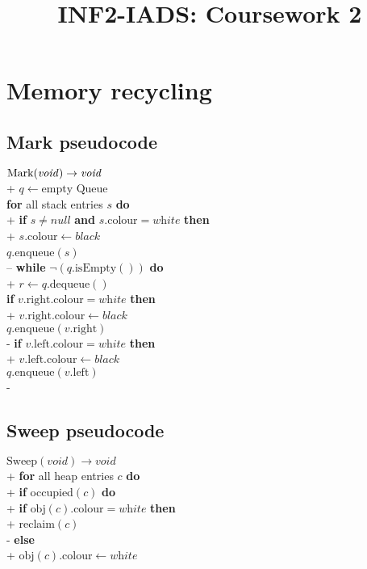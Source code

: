 \documentclass{article}
\title{INF2-IADS: Coursework 2}
\begin{document}
\maketitle

\tableofcontents

\section{Memory recycling}

\subsection{Mark pseudocode}

\begin{pseudo}
$\text{Mark}(\text{\emph{void}}) \to \text{\emph{void}}$\\+
    $q\leftarrow \text{empty Queue}$\\
    \textbf{for} all stack entries $s$ \textbf{do}\\+
        \textbf{if} $s\not=\textit{null}$ \textbf{and} $s.\text{colour} = \textit{white}$ \textbf{then}\\+
            $s.\text{colour} \leftarrow \textit{black}$\\
            $q$.enqueue$(s)$\\--
    \textbf{while} $\neg(q.\text{isEmpty}())$ \textbf{do}\\+
        $r\leftarrow q.\text{dequeue}()$\\
        \textbf{if} $v.\text{right}.\text{colour} = \textit{white}$ \textbf{then}\\+
            $v.\text{right}.\text{colour}\leftarrow\textit{black}$\\
            $q.\text{enqueue}(v.\text{right})$\\-
        \textbf{if} $v.\text{left}.\text{colour} = \textit{white}$ \textbf{then}\\+
            $v.\text{left}.\text{colour}\leftarrow\textit{black}$\\
            $q.\text{enqueue}(v.\text{left})$\\-
\end{pseudo}

\subsection{Sweep pseudocode}

\begin{pseudo}
$\text{Sweep}(\textit{void})\to\textit{void}$\\+
    \textbf{for} all heap entries $c$ \textbf{do}\\+
        \textbf{if} occupied$(c)$ \textbf{do}\\+
            \textbf{if} $\text{obj}(c).\text{colour} = \textit{white}$ \textbf{then}\\+
                reclaim$(c)$\\-
            \textbf{else}\\+
                $\text{obj}(c).\text{colour}\leftarrow\textit{white}$
\end{pseudo}
\end{document}
